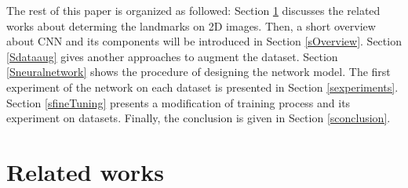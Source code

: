 \documentclass[review]{elsarticle}
\begin{document}
\fi
The rest of this paper is organized as followed: Section \ref{related_works} discusses the related works about determing the landmarks on 2D images. Then, a short overview about CNN and its components will be introduced in Section \ref{sOverview}. Section \ref{Sdataaug} gives another approaches to augment the dataset. Section \ref{Sneuralnetwork} shows the procedure of designing the network model. The first experiment of the network on each dataset is presented in Section \ref{sexperiments}. Section \ref{sfineTuning} presents a modification of training process and its experiment on datasets. Finally, the conclusion is given in Section \ref{sconclusion}.

\section{Related works}
\label{related_works}
\end{document}
